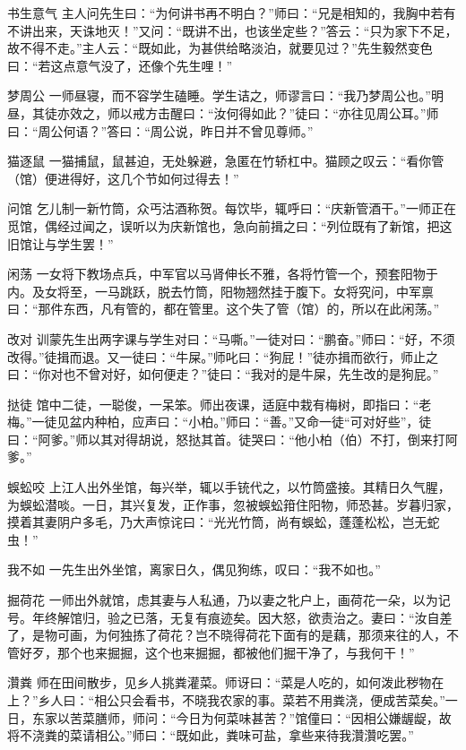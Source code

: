 \documentclass[12pt,UTF8]{ctexbook}
\begin{document}
书生意气
主人问先生曰：“为何讲书再不明白？”师曰：“兄是相知的，我胸中若有不讲出来，天诛地灭！”又问：“既讲不出，也该坐定些？”答云：“只为家下不足，故不得不走。”主人云：“既如此，为甚供给略淡泊，就要见过？”先生毅然变色曰：“若这点意气没了，还像个先生哩！”

梦周公
一师昼寝，而不容学生磕睡。学生诘之，师谬言曰：“我乃梦周公也。”明昼，其徒亦效之，师以戒方击醒曰：“汝何得如此？”徒曰：“亦往见周公耳。”师曰：“周公何语？”答曰：“周公说，昨日并不曾见尊师。”

猫逐鼠
一猫捕鼠，鼠甚迫，无处躲避，急匿在竹轿杠中。猫顾之叹云：“看你管（馆）便进得好，这几个节如何过得去！”

问馆
乞儿制一新竹筒，众丐沽酒称贺。每饮毕，辄呼曰：“庆新管酒干。”一师正在觅馆，偶经过闻之，误听以为庆新馆也，急向前揖之曰：“列位既有了新馆，把这旧馆让与学生罢！”

闲荡
一女将下教场点兵，中军官以马肾伸长不雅，各将竹管一个，预套阳物于内。及女将至，一马跳跃，脱去竹筒，阳物翘然挂于腹下。女将究问，中军禀曰：“那件东西，凡有管的，都在管里。这个失了管（馆）的，所以在此闲荡。”

改对
训蒙先生出两字课与学生对曰：“马嘶。”一徒对曰：“鹏奋。”师曰：“好，不须改得。”徒揖而退。又一徒曰：“牛屎。”师叱曰：“狗屁！”徒亦揖而欲行，师止之曰：“你对也不曾对好，如何便走？”徒曰：“我对的是牛屎，先生改的是狗屁。”

挞徒
馆中二徒，一聪俊，一呆笨。师出夜课，适庭中栽有梅树，即指曰：“老梅。”一徒见盆内种柏，应声曰：“小柏。”师曰：“善。”又命一徒“可对好些”，徒曰：“阿爹。”师以其对得胡说，怒挞其首。徒哭曰：“他小柏（伯）不打，倒来打阿爹。”

蜈蚣咬
上江人出外坐馆，每兴举，辄以手铳代之，以竹筒盛接。其精日久气腥，为蜈蚣潜啖。一日，其兴复发，正作事，忽被蜈蚣箝住阳物，师恐甚。岁暮归家，摸着其妻阴户多毛，乃大声惊诧曰：“光光竹筒，尚有蜈蚣，蓬蓬松松，岂无蛇虫！”

我不如
一先生出外坐馆，离家日久，偶见狗练，叹曰：“我不如也。”

掘荷花
一师出外就馆，虑其妻与人私通，乃以妻之牝户上，画荷花一朵，以为记号。年终解馆归，验之已落，无复有痕迹矣。因大怒，欲责治之。妻曰：“汝自差了，是物可画，为何独拣了荷花？岂不晓得荷花下面有的是藕，那须来往的人，不管好歹，那个也来掘掘，这个也来掘掘，都被他们掘干净了，与我何干！”

灒粪
师在田间散步，见乡人挑粪灌菜。师讶曰：“菜是人吃的，如何泼此秽物在上？”乡人曰：“相公只会看书，不晓我农家的事。菜若不用粪浇，便成苦菜矣。”一日，东家以苦菜膳师，师问：“今日为何菜味甚苦？”馆僮曰：“因相公嫌龌龊，故将不浇粪的菜请相公。”师曰：“既如此，粪味可盐，拿些来待我灒灒吃罢。”
\end{document}
